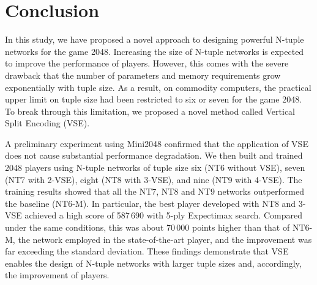 \section{Conclusion}
In this study, we have proposed a novel approach to designing powerful N-tuple networks for the game 2048.
Increasing the size of N-tuple networks is expected to improve the performance of players.
However, this comes with the severe drawback that the number of parameters and memory requirements grow exponentially with tuple size.  As a result, on commodity computers, the practical upper limit on tuple size had been restricted to six or seven for the game 2048.
To break through this limitation, we proposed a novel method called Vertical Split Encoding (VSE).


A preliminary experiment using Mini2048 confirmed that the application of VSE does not cause substantial performance degradation.
We then built and trained 2048 players using N-tuple networks of tuple size six (\textsf{NT6} without VSE), seven (\textsf{NT7} with 2-VSE), eight (\textsf{NT8} with 3-VSE), and nine (\textsf{NT9} with 4-VSE).
The training results showed that all the \textsf{NT7}, \textsf{NT8} and \textsf{NT9} networks outperformed the baseline (\textsf{NT6-M}).
In particular, the best player developed with \textsf{NT8} and 3-VSE achieved a high score of 587\,690 with 5-ply Expectimax search. Compared under the same conditions, this was about 70\,000 points higher than that of \textsf{NT6-M}, the network employed in the state-of-the-art player, and the improvement was far exceeding the standard deviation.
These findings demonstrate that VSE enables the design of N-tuple networks with larger tuple sizes and, accordingly, the improvement of players.

